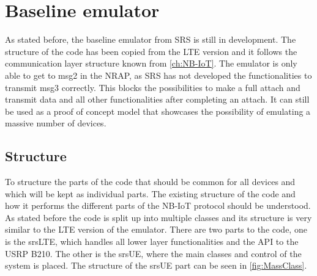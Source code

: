 


 

\section{Baseline emulator}

As stated before, the baseline emulator from SRS is still in development. The structure of the code has been copied from the LTE version and it follows the communication layer structure known from \autoref{ch:NB-IoT}. The emulator is only able to get to msg2 in the NRAP, as SRS has not developed the functionalities to transmit msg3 correctly. This blocks the possibilities to make a full attach and transmit data and all other functionalities after completing an attach. It can still be used as a proof of concept model that showcases the possibility of emulating a massive number of devices. 



\subsection{Structure}

\label{sub:MassStruct}

To structure the parts of the code that should be common for all devices and which will be kept as individual parts. The existing structure of the code and how it performs the different parts of the NB-IoT protocol should be understood. As stated before the code is split up into multiple classes and its structure is very similar to the LTE version of the emulator. There are two parts to the code, one is the srsLTE, which handles all lower layer functionalities and the API to the USRP B210. The other is the srsUE, where the main classes and control of the system is placed. The structure of the srsUE part can be seen in \autoref{fig:MassClass}. 

